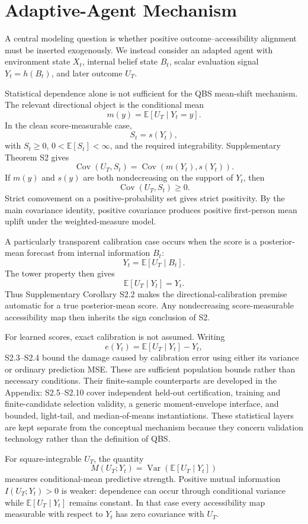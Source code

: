 \section{Adaptive-Agent Mechanism}

A central modeling question is whether positive outcome--accessibility alignment must be inserted exogenously. We instead consider an adapted agent with environment state $X_t$, internal belief state $B_t$, scalar evaluation signal $Y_t=h(B_t)$, and later outcome $U_T$.

Statistical dependence alone is not sufficient for the QBS mean-shift mechanism. The relevant directional object is the conditional mean
\[
m(y)=\mathbb E[U_T\mid Y_t=y].
\]
In the clean score-measurable case,
\[
S_t=s(Y_t),
\]
with $S_t\ge0$, $0<\mathbb E[S_t]<\infty$, and the required integrability. Supplementary Theorem S2 gives
\[
\operatorname{Cov}(U_T,S_t)
=
\operatorname{Cov}(m(Y_t),s(Y_t)).
\]
If $m(y)$ and $s(y)$ are both nondecreasing on the support of $Y_t$, then
\[
\operatorname{Cov}(U_T,S_t)\ge0.
\]
Strict comovement on a positive-probability set gives strict positivity. By the main covariance identity, positive covariance produces positive first-person mean uplift under the weighted-measure model.

A particularly transparent calibration case occurs when the score is a posterior-mean forecast from internal information $B_t$:
\[
Y_t=\mathbb E[U_T\mid B_t].
\]
The tower property then gives
\[
\mathbb E[U_T\mid Y_t]
=
Y_t.
\]
Thus Supplementary Corollary S2.2 makes the directional-calibration premise automatic for a true posterior-mean score. Any nondecreasing score-measurable accessibility map then inherits the sign conclusion of S2.

For learned scores, exact calibration is not assumed. Writing
\[
e(Y_t)=\mathbb E[U_T\mid Y_t]-Y_t,
\]
S2.3--S2.4 bound the damage caused by calibration error using either its variance or ordinary prediction MSE. These are sufficient population bounds rather than necessary conditions. Their finite-sample counterparts are developed in the Appendix: S2.5--S2.10 cover independent held-out certification, training and finite-candidate selection validity, a generic moment-envelope interface, and bounded, light-tail, and median-of-means instantiations. These statistical layers are kept separate from the conceptual mechanism because they concern validation technology rather than the definition of QBS.

For square-integrable $U_T$, the quantity
\[
M(U_T;Y_t)
=
\operatorname{Var}(\mathbb E[U_T\mid Y_t])
\]
measures conditional-mean predictive strength. Positive mutual information $I(U_T;Y_t)>0$ is weaker: dependence can occur through conditional variance while $\mathbb E[U_T\mid Y_t]$ remains constant. In that case every accessibility map measurable with respect to $Y_t$ has zero covariance with $U_T$.

